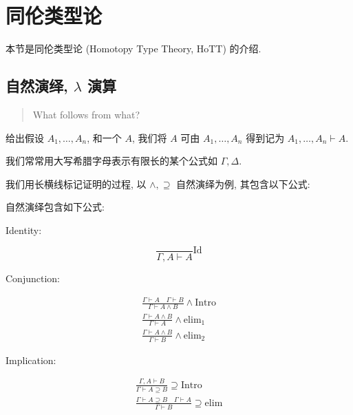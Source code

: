 \section{同伦类型论}

本节是同伦类型论 (Homotopy Type Theory, HoTT) 的介绍.

\subsection{自然演绎, \(\lambda\) 演算}

\begin{quotation}
    What follows from what?
\end{quotation}

\begin{remark}
    给出假设 \(A_1, \ldots, A_n\), 和一个 \(A\), 我们将 \(A\) 可由 \(A_1, \ldots, A_n\) 得到记为 \(A_1, \ldots, A_n \vdash A\).
\end{remark}

\begin{remark}
    我们常常用大写希腊字母表示有限长的某个公式如 \(\Gamma,\Delta\).
\end{remark}

我们用长横线标记证明的过程, 以 \(\land,\supseteq\) 自然演绎为例, 其包含以下公式:

\begin{axiom}
    \label {axiom:natural deduction}
    自然演绎包含如下公式:

    Identity:

    \[
        \frac{}{\Gamma,A \vdash A} \mathrm{Id}
    \]

    Conjunction:

    \[
        \begin{aligned}
            \frac{\Gamma \vdash A \quad \Gamma \vdash B}{\Gamma \vdash A \land B} \land \mathrm{Intro} \\
            \frac{\Gamma \vdash A \land B}{\Gamma \vdash A} \land \mathrm{elim}_1 \\
            \frac{\Gamma \vdash A \land B}{\Gamma \vdash B} \land \mathrm{elim}_2
        \end{aligned}
    \]

    Implication:

    \[
        \begin{aligned}
            \frac{\Gamma,A \vdash B}{\Gamma \vdash A \supseteq B} \supseteq \mathrm{Intro}\\
            \frac{\Gamma \vdash A \supseteq B \quad \Gamma \vdash A}{\Gamma \vdash B} \supseteq \mathrm{elim}
        \end{aligned}
    \]
\end{axiom}

